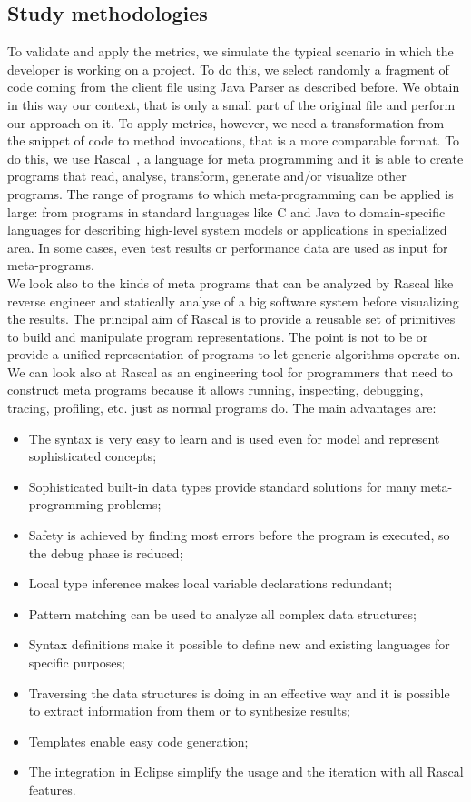 \subsection{Study methodologies}
To validate and apply the metrics, we simulate the typical scenario in which the developer is working on a project. To do this, we select randomly a fragment of code coming from the client file using Java Parser as described before. We obtain in this way our context, that is only a small part of the original file and perform our approach on it. To apply metrics, however, we need a transformation from the snippet of code to method invocations, that is a more comparable format. To do this, we use Rascal~\cite{utor.rascal-mpl.org/_last_nodate}, a language for meta programming and it is able to create programs that read, analyse, transform, generate and/or visualize other programs. The range of programs to which meta-programming can be applied is large: from programs in standard languages like C and Java to domain-specific languages for describing high-level system models or applications in specialized area. In some cases, even test results or performance data are used as input for meta-programs. \\
We look also to the kinds of meta programs that can be analyzed by Rascal like reverse engineer and statically analyse of a big software system before visualizing the results. The principal aim of Rascal is to provide a reusable set of primitives to build and manipulate program representations. The point is not to be or provide a unified representation of programs to let generic algorithms operate on.  
We can look also at Rascal as an engineering tool for programmers that need to construct meta programs because it allows running, inspecting, debugging, tracing, profiling, etc. just as normal programs do. The main advantages are:
\begin{itemize}
\item The syntax is very easy to learn and is used even for model and represent sophisticated concepts;
\item Sophisticated built-in data types provide standard solutions for many meta-programming problems;
\item Safety is achieved by finding most errors before the program is executed, so the debug phase is reduced;
\item Local type inference makes local variable declarations redundant;
\item Pattern matching can be used to analyze all complex data structures;
\item Syntax definitions make it possible to define new and existing languages for specific purposes;
\item Traversing the data structures is doing in an effective way and it is possible to extract information from them or to synthesize results;
\item Templates enable easy code generation;
\item The integration in Eclipse simplify the usage and the iteration with all Rascal features.
\end{itemize}
